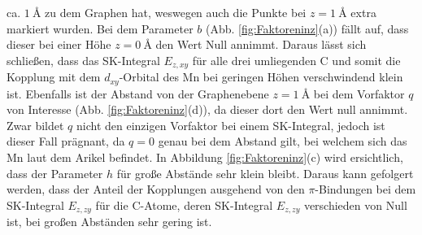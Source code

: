 ca. $\qty{1}{\angstrom}$ zu dem Graphen hat, weswegen auch die Punkte bei $z = \qty{1}{\angstrom}$ extra markiert wurden.
Bei dem Parameter $b$ (Abb. \ref{fig:Faktoreninz}(a)) fällt auf, dass dieser bei einer Höhe $z = \qty{0}{\angstrom} $ den Wert Null annimmt.
Daraus lässt sich schließen, dass das SK-Integral $E_{z,xy}$ für alle drei umliegenden C und somit die Kopplung mit 
dem $d_{xy}$-Orbital des Mn bei geringen Höhen verschwindend klein ist. 
Ebenfalls ist der Abstand von der Graphenebene $z=\qty{1}{\angstrom}$ bei dem Vorfaktor $q$ von Interesse (Abb. \ref{fig:Faktoreninz}(d)), da dieser dort den Wert null annimmt.
Zwar bildet $q$ nicht den einzigen Vorfaktor bei einem SK-Integral, jedoch ist dieser Fall prägnant, da $q=0$ genau bei dem Abstand gilt, 
bei welchem sich das Mn laut dem Arikel \cite{doi:10.1021/acsnano.1c00139} befindet.
In Abbildung \ref{fig:Faktoreninz}(c) wird ersichtlich, dass der Parameter $h$ für große Abstände sehr klein bleibt. 
Daraus kann gefolgert werden, dass der Anteil der Kopplungen ausgehend von den $\pi$-Bindungen bei dem SK-Integral $E_{z,zy}$ für die C-Atome, deren
SK-Integral $E_{z,zy}$ verschieden von Null ist, bei großen Abständen sehr gering ist.
